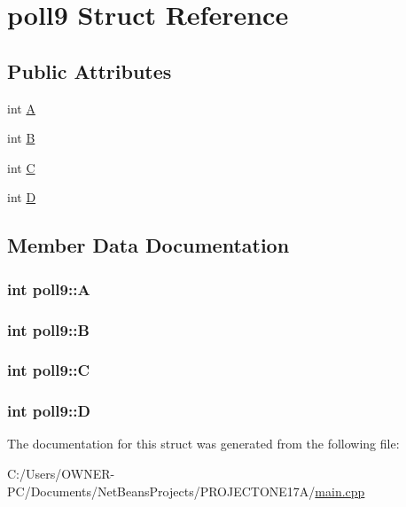 \hypertarget{structpoll9}{\section{poll9 Struct Reference}
\label{structpoll9}
}
\subsection*{Public Attributes}
\begin{DoxyCompactItemize}
\item 
int \hyperlink{structpoll9_a2a3f2e75021cbd2531d5a4a41f8778e5}{A}
\item 
int \hyperlink{structpoll9_a853cdf4ffc5ffb34e2a60a255cffc85d}{B}
\item 
int \hyperlink{structpoll9_ab83d0b42ed3ebe7fd1de2690ca32c8e7}{C}
\item 
int \hyperlink{structpoll9_a274cf499d3c518219c06a5059ac27a09}{D}
\end{DoxyCompactItemize}


\subsection{Member Data Documentation}
\hypertarget{structpoll9_a2a3f2e75021cbd2531d5a4a41f8778e5}{
\subsubsection[{A}]{\setlength{\rightskip}{0pt plus 5cm}int poll9\+::\+A}}\label{structpoll9_a2a3f2e75021cbd2531d5a4a41f8778e5}
\hypertarget{structpoll9_a853cdf4ffc5ffb34e2a60a255cffc85d}{
\subsubsection[{B}]{\setlength{\rightskip}{0pt plus 5cm}int poll9\+::\+B}}\label{structpoll9_a853cdf4ffc5ffb34e2a60a255cffc85d}
\hypertarget{structpoll9_ab83d0b42ed3ebe7fd1de2690ca32c8e7}{
\subsubsection[{C}]{\setlength{\rightskip}{0pt plus 5cm}int poll9\+::\+C}}\label{structpoll9_ab83d0b42ed3ebe7fd1de2690ca32c8e7}
\hypertarget{structpoll9_a274cf499d3c518219c06a5059ac27a09}{
\subsubsection[{D}]{\setlength{\rightskip}{0pt plus 5cm}int poll9\+::\+D}}\label{structpoll9_a274cf499d3c518219c06a5059ac27a09}


The documentation for this struct was generated from the following file\+:\begin{DoxyCompactItemize}
\item 
C\+:/\+Users/\+O\+W\+N\+E\+R-\/\+P\+C/\+Documents/\+Net\+Beans\+Projects/\+P\+R\+O\+J\+E\+C\+T\+O\+N\+E17\+A/\hyperlink{main_8cpp}{main.\+cpp}\end{DoxyCompactItemize}
